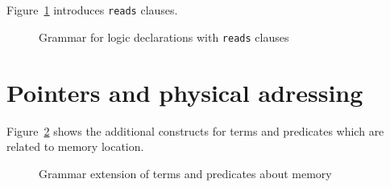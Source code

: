 \subsection{}
\label{sec:reads}
\experimental

\nodiff

Figure~\ref{fig:gram:logicreads} introduces \lstinline|reads| clauses.

\begin{figure}[htp]
  \begin{cadre}
      
    \end{cadre}
  \caption{Grammar for logic declarations with \lstinline|reads| clauses}
\label{fig:gram:logicreads}
\end{figure}



\subsection{}
\label{sec:specmodules}
\nodiff


\section{Pointers and physical adressing}
\label{sec:pointers}

\nodiff

Figure~\ref{fig:gram:memory} shows the additional constructs for terms and
predicates which are related to memory location.
\begin{figure}[htbp]
  \caption{Grammar extension of terms and predicates about memory}
\label{fig:gram:memory}
\end{figure}


